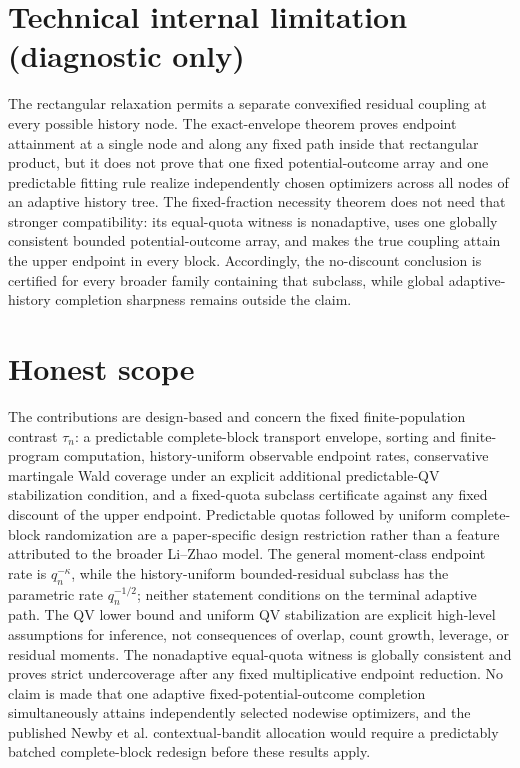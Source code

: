\documentclass{article}
\begin{document}
\section*{Technical internal limitation (diagnostic only)}

The rectangular relaxation permits a separate convexified residual coupling at every possible history node.  The exact-envelope theorem proves endpoint attainment at a single node and along any fixed path inside that rectangular product, but it does not prove that one fixed potential-outcome array and one predictable fitting rule realize independently chosen optimizers across all nodes of an adaptive history tree.  The fixed-fraction necessity theorem does not need that stronger compatibility: its equal-quota witness is nonadaptive, uses one globally consistent bounded potential-outcome array, and makes the true coupling attain the upper endpoint in every block.  Accordingly, the no-discount conclusion is certified for every broader family containing that subclass, while global adaptive-history completion sharpness remains outside the claim.

\section{Honest scope}

The contributions are design-based and concern the fixed finite-population contrast \(\tau_n\): a predictable complete-block transport envelope, sorting and finite-program computation, history-uniform observable endpoint rates, conservative martingale Wald coverage under an explicit additional predictable-QV stabilization condition, and a fixed-quota subclass certificate against any fixed discount of the upper endpoint.  Predictable quotas followed by uniform complete-block randomization are a paper-specific design restriction rather than a feature attributed to the broader Li--Zhao model.  The general moment-class endpoint rate is \(q_n^{-\kappa}\), while the history-uniform bounded-residual subclass has the parametric rate \(q_n^{-1/2}\); neither statement conditions on the terminal adaptive path.  The QV lower bound and uniform QV stabilization are explicit high-level assumptions for inference, not consequences of overlap, count growth, leverage, or residual moments.  The nonadaptive equal-quota witness is globally consistent and proves strict undercoverage after any fixed multiplicative endpoint reduction.  No claim is made that one adaptive fixed-potential-outcome completion simultaneously attains independently selected nodewise optimizers, and the published Newby et al. contextual-bandit allocation would require a predictably batched complete-block redesign before these results apply.
\end{document}
